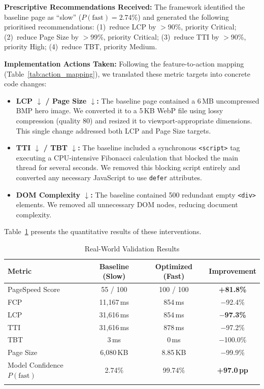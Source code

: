 \documentclass[sn-nature]{sn-jnl}
\begin{document}
\textbf{Prescriptive Recommendations Received:} The framework identified the baseline page as ``slow'' ($P(\text{fast}) = 2.74\%$) and generated the following prioritised recommendations: (1)~reduce LCP by $>$90\%, priority Critical; (2)~reduce Page Size by $>$99\%, priority Critical; (3)~reduce TTI by $>$90\%, priority High; (4)~reduce TBT, priority Medium.

\textbf{Implementation Actions Taken:} Following the feature-to-action mapping (Table~\ref{tab:action_mapping}), we translated these metric targets into concrete code changes:

\begin{itemize}
    \item \textbf{LCP $\downarrow$ / Page Size $\downarrow$:} The baseline page contained a 6\,MB uncompressed BMP hero image. We converted it to a 5\,KB WebP file using lossy compression (quality 80) and resized it to viewport-appropriate dimensions. This single change addressed both LCP and Page Size targets.
    
    \item \textbf{TTI $\downarrow$ / TBT $\downarrow$:} The baseline included a synchronous \texttt{<script>} tag executing a CPU-intensive Fibonacci calculation that blocked the main thread for several seconds. We removed this blocking script entirely and converted any necessary JavaScript to use \texttt{defer} attributes.
    
    \item \textbf{DOM Complexity $\downarrow$:} The baseline contained 500 redundant empty \texttt{<div>} elements. We removed all unnecessary DOM nodes, reducing document complexity.
\end{itemize}

Table~\ref{tab:realworld} presents the quantitative results of these interventions.

\begin{table}[htbp]
\caption{Real-World Validation Results}\label{tab:realworld}
\centering
\begin{tabular}{l c c c}
\toprule
Metric & Baseline (Slow) & Optimized (Fast) & Improvement \\
\midrule
PageSpeed Score & 55 / 100 & 100 / 100 & \textbf{+81.8\%} \\
FCP & 11,167\,ms & 854\,ms & $-$92.4\% \\
LCP & 31,616\,ms & 854\,ms & \textbf{$-$97.3\%} \\
TTI & 31,616\,ms & 878\,ms & $-$97.2\% \\
TBT & 3\,ms & 0\,ms & $-$100.0\% \\
Page Size & 6,080\,KB & 8.85\,KB & $-$99.9\% \\
Model Confidence $P(\text{fast})$ & 2.74\% & 99.74\% & \textbf{+97.0\,pp} \\
\botrule
\end{tabular}
\end{table}
\end{document}
